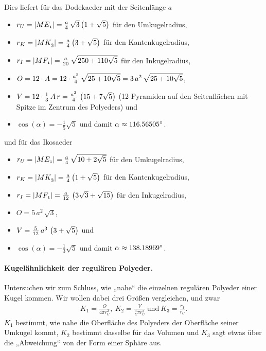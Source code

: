 \documentclass[11pt]{article}
\begin{document}
Dies liefert für das Dodekaeder mit der Seitenlänge $a$
\begin{itemize}
\item $r_U=\left\vert {\mathnormal{ME_1}}\right\vert=\frac{a}{4}\,\sqrt{3}\left(1+\sqrt{5}\right)$ für den
  Umkugelradius,
\item $r_K=\left\vert {\mathnormal{MK_3}}\right\vert=\frac{a}{4}\left(3+\sqrt{5}\right)$ für den
  Kantenkugelradius,
\item $r_I=\left\vert {\mathnormal{MF_1}}\right\vert=\frac{a}{20}\,\sqrt{250+110\sqrt{5}}$ für den
  Inkugelradius,
\item $O=12\cdot A=12\cdot\frac{a^2}{4}\,\sqrt{25+10\sqrt{5}}
  =3\,a^2\,\sqrt{25+10\sqrt{5}}$,
\item $V=12\cdot\frac13\,A\,r =\frac{a^3}{4}\,\left(15+7\sqrt{5}\right)$ (12 Pyramiden
  auf den Seitenflächen mit Spitze im Zentrum des Polyeders) und
\item $\cos(\alpha)=-\frac15\sqrt{5}$ und damit $\alpha\approx
  116.56505^{\circ}$.
\end{itemize}
und für das Ikosaeder
\begin{itemize}
\item $r_U=\left\vert {\mathnormal{ME_1}}\right\vert=\frac{a}{4}\,\sqrt{10+2\sqrt{5}}$ für den
  Umkugelradius,
\item $r_K=\left\vert {\mathnormal{MK_3}}\right\vert=\frac{a}{4}\left(1+\sqrt{5}\right)$ für den
  Kantenkugelradius,
\item $r_I=\left\vert {\mathnormal{MF_1}}\right\vert=\frac{a}{12}\,\left(3\sqrt{3}+\sqrt{15}\right)$ für den
  Inkugelradius,
\item $O=5\,a^2\,\sqrt{3}$,
\item $V=\frac{5}{12}\,a^3\,\left(3+\sqrt{5}\right)$ und
\item $\cos(\alpha)=-\frac13\sqrt{5}$ und damit $\alpha\approx
  138.18969^{\circ}$.
\end{itemize}

\paragraph{Kugelähnlichkeit der regulären Polyeder.}
Untersuchen wir zum Schluss, wie „nahe“ die einzelnen regulären Polyeder einer
Kugel kommen.  Wir wollen dabei drei Größen vergleichen, und zwar
\begin{gather*}
  K_1=\frac{O}{4\pi r_U^2},\ K_2=\frac{V}{\frac43\pi
    r_U^3}\ \text{und}\ K_3=\frac{r_I}{r_U}.
\end{gather*}
$K_1$ bestimmt, wie nahe die Oberfläche des Polyeders der Oberfläche seiner
Umkugel kommt, $K_2$ bestimmt dasselbe für das Volumen und $K_3$ sagt etwas
über die „Abweichung“ von der Form einer Sphäre aus.
\end{document}
